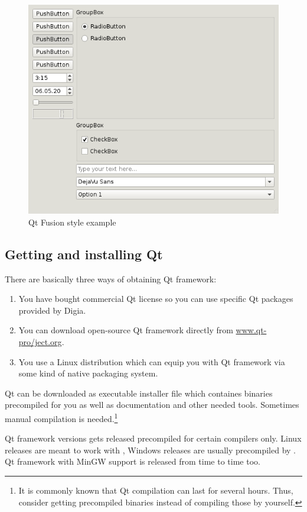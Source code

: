 \begin{figure}[ht]
\caption{Qt Fusion style example}\label{figure:fusion}
\centering\includegraphics{graphics/laboratory/01-fusion.png}
\end{figure}

\subsection{Getting and installing Qt}
There are basically three ways of obtaining Qt framework:
\begin{enumerate}
\item You have bought commercial Qt license so you can use specific Qt packages provided by Digia.
\item You can download open-source Qt framework directly from \href{http://www.qt-project.org/}{www.qt-pro\-/ject.org}.
\item You use a Linux distribution which can equip you with Qt framework via some kind of native packaging system.
\end{enumerate}

Qt can be downloaded as executable installer file which containes binaries precompiled for you as well as documentation and other needed tools. Sometimes manual compilation is needed.\footnote{It is commonly known that Qt compilation can last for several hours. Thus, consider getting precompiled binaries instead of compiling those by yourself.}

Qt framework versions gets released precompiled for certain compilers only. Linux releases are meant to work with , Windows releases are usually precompiled by . Qt framework with MinGW support is released from time to time too.


